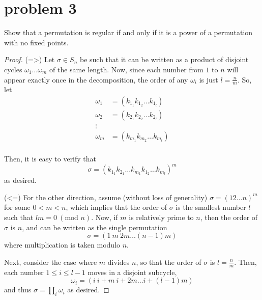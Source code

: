 \documentclass[paper=a4, fontsize=11pt]{scrartcl} %
\numberwithin{equation}{section} %
\numberwithin{figure}{section} %
\numberwithin{table}{section} %
\begin{document}
\section*{problem 3}
Show that a permutation is regular if and only if it is a power of a permutation with no fixed points.
\\
\begin{proof}
(=>)
Let $\sigma\in S_n$ be such that it can be written as a product of disjoint cycles $\omega_1\ldots\omega_m$
of the same length.
Now, since each number from $1$ to $n$ will appear exactly once in the decomposition,
the order of any $\omega_i$ is just $l = \frac{n}{m}$.
So, let 
\[
\begin{aligned}
\omega_1 &= (k_{1_1} k_{1_2}\ldots k_{1_l})\\
\omega_2 &= (k_{2_1} k_{2_2}\ldots k_{2_l})\\
\vdots &\\
\omega_m &= (k_{m_1} k_{m_2}\ldots k_{m_l})\\
\end{aligned}
\]

Then, it is easy to verify that
\[
\sigma = (k_{1_1} k_{2_1}\ldots k_{m_1} k_{1_2} \ldots k_{m_l})^m
\]
as desired.

(<=)
For the other direction, assume (without loss of generality) 
$\sigma = (1 2 \ldots n)^m$ for some $0<m<n$, which implies that the order of $\sigma$
is the smallest number $l$ such that $lm=0\ (\textrm{mod }n)$. 
Now, if $m$ is relatively prime to $n$, then the order of $\sigma$ is $n$,
and can be written as the single permutation
\[
\sigma = (1\ m\ 2m \ldots (n-1)m)
\]
where multiplication is taken modulo $n$.

Next, consider the case where $m$ divides $n$, so that the order of $\sigma$ is 
$l = \frac{n}{m}$. Then, each number $1\leq i \leq l-1$ moves in a disjoint subcycle,
\[
\omega_i = (i\ i+m\ i+2m\ldots i+(l-1)m)
\]
and thus $\sigma = \prod_i\omega_i$ as desired.
\end{proof}
\end{document}

